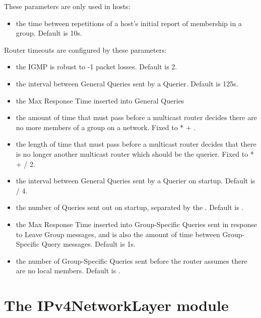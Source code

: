 These parameters are only used in hosts:

\begin{itemize}
  \item {} the time between repetitions of a
   host's initial report of membership in a group. Default is 10s.
\end{itemize}

Router timeouts are configured by these parameters:

\begin{itemize}
  \item {} the IGMP is robust to -1
   packet losses. Default is 2.
  \item {} the interval between General Queries sent by a Querier.
   Default is 125s.
  \item {} the Max Response Time inserted into General Queries
  \item {} the amount of time that must pass before
   a multicast router decides there are no more members of a group on a network.
   Fixed to  *  + .
  \item {} the length of time that must
   pass before a multicast router decides that there is no longer
   another multicast router which should be the querier.
   Fixed to  *  +  / 2.
  \item {} the interval between General Queries
   sent by a Querier on startup. Default is  / 4.
  \item {} the number of Queries sent out on startup,
   separated by the . Default is .
  \item {} the Max Response Time inserted into
   Group-Specific Queries sent in response to Leave Group messages, and
   is also the amount of time between Group-Specific Query messages.
   Default is 1s.
  \item {} the number of Group-Specific Queries
   sent before the router assumes there are no local members.
   Default is .
\end{itemize}

\section{The IPv4NetworkLayer module}

